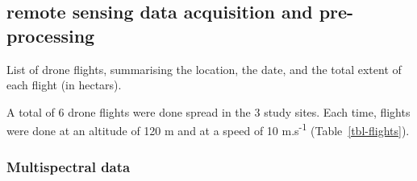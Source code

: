 \documentclass[
  letterpaper,
  DIV=11,
  numbers=noendperiod]{scrartcl}
\begin{document}
\subsection{remote sensing data acquisition and
pre-processing}\label{sec-DroneFlights}

\begin{table}

\caption{\label{tbl-flights}List of drone flights, summarising the
location, the date, and the total extent of each flight (in hectars).}


\end{table}%

A total of 6 drone flights were done spread in the 3 study sites. Each
time, flights were done at an altitude of 120 m and at a speed of 10
m.s\textsuperscript{-1} (Table~\ref{tbl-flights}).

\subsubsection{Multispectral data}\label{sec-photo}
\end{document}
